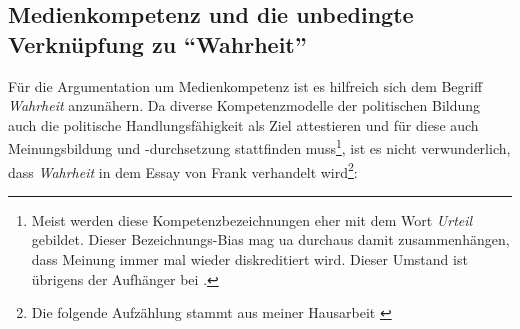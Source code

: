 

\subsection{Medienkompetenz und die unbedingte Verknüpfung zu \enquote{Wahrheit} \label{media}} 
Für die Argumentation um Medienkompetenz ist es hilfreich sich dem Begriff \emph{Wahrheit} anzunähern. 
Da diverse Kompetenzmodelle der politischen Bildung auch die politische Handlungsfähigkeit als Ziel attestieren und für diese auch Meinungsbildung und -durchsetzung stattfinden muss\footnote{
    Meist werden diese Kompetenzbezeichnungen eher mit dem Wort \emph{Urteil} gebildet. Dieser Bezeichnungs-Bias mag \gls{ua} durchaus damit zusammenhängen, dass Meinung immer mal wieder diskreditiert wird. Dieser Umstand ist übrigens der Aufhänger bei \textcite[]{Nullmeier2019}.

}, ist es nicht verwunderlich, dass \emph{Wahrheit} in dem Essay  von Frank \textcite[]{Nullmeier2019} verhandelt wird\footnote{Die folgende Aufzählung stammt aus meiner Hausarbeit \autocite[4]{Klein2022}}:

